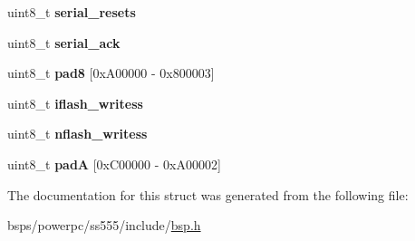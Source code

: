 \begin{DoxyCompactItemize}
\mbox{\label{structcpld___a05fa688798d8460f08fbe196f1740fc1}} 
uint8\+\_\+t {\bfseries serial\+\_\+resets}
\item 
\mbox{\label{structcpld___ac42a71563da65e33b9021ae4c8f6b8ff}} 
uint8\+\_\+t {\bfseries serial\+\_\+ack}
\item 
\mbox{\label{structcpld___a833a79f3742f362fff25ba92b8440a4c}} 
uint8\+\_\+t {\bfseries pad8} \mbox{[}0x\+A00000 -\/ 0x800003\mbox{]}
\item 
\mbox{\label{structcpld___a3c25028a54fac8b9a1ddba3b1c1368a9}} 
uint8\+\_\+t {\bfseries iflash\+\_\+writess}
\item 
\mbox{\label{structcpld___aec6eb743766584b385a85732c0dc9cf5}} 
uint8\+\_\+t {\bfseries nflash\+\_\+writess}
\item 
\mbox{\label{structcpld___a4145ce0f3e4b930968b471a6773062df}} 
uint8\+\_\+t {\bfseries padA} \mbox{[}0x\+C00000 -\/ 0x\+A00002\mbox{]}
\end{DoxyCompactItemize}


The documentation for this struct was generated from the following file\+:\begin{DoxyCompactItemize}
\item 
bsps/powerpc/ss555/include/\mbox{\hyperlink{bsps_2powerpc_2ss555_2include_2bsp_8h}{bsp.\+h}}\end{DoxyCompactItemize}
